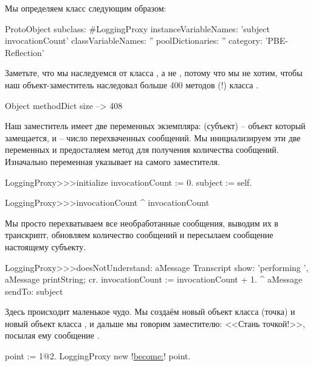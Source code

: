 \documentclass[a4paper,10pt,twoside]{book}
\begin{document}
Мы определяем класс  следующим образом:
\begin{code}{}
ProtoObject subclass: #LoggingProxy
	instanceVariableNames: 'subject invocationCount'
	classVariableNames: ''
	poolDictionaries: ''
	category: 'PBE-Reflection'
\end{code}
Заметьте, что мы наследуемся от класса , а не , потому что мы не хотим, чтобы наш объект-заместитель наследовал больше 400 методов (!) класса .

\begin{code}{}
Object methodDict size --> 408
\end{code}

Наш заместитель имеет две переменных экземпляра:  (субъект) -- объект который замещается, и  -- число перехваченных сообщений.
Мы инициализируем эти две переменных и предосталяем метод для получения количества сообщений.
Изначально переменная  указывает на самого заместителя.
\begin{code}{}
LoggingProxy>>>initialize
	invocationCount := 0.
	subject := self.
\end{code}

\begin{code}{}
LoggingProxy>>>invocationCount
	^ invocationCount
\end{code}

Мы просто перехватываем все необработанные сообщения, выводим их в транскрипт, обновляем количество сообщений и пересылаем сообщение настоящему субъекту.
\begin{code}{}
LoggingProxy>>>doesNotUnderstand: aMessage 
	Transcript show: 'performing ', aMessage printString; cr.
	invocationCount := invocationCount + 1.
	^ aMessage sendTo: subject
\end{code}

Здесь происходит маленькое чудо.
Мы создаём новый объект класса  (точка) и новый объект класса , и дальше мы говорим заместителю: <<Стань точкой!>>, посылая ему сообщение .
\begin{code}{}
point := 1@2.
LoggingProxy new !\underline{become:}! point.
\end{code}
\end{document}
